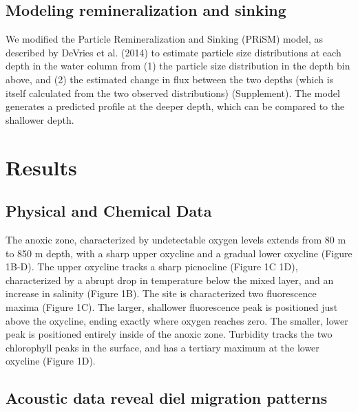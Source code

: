 \documentclass[]{article}
\begin{document}
\hypertarget{modeling-remineralization-and-sinking}{%
\subsection{Modeling remineralization and
sinking}\label{modeling-remineralization-and-sinking}}

We modified the Particle Remineralization and Sinking (PRiSM) model, as
described by DeVries et al. (2014) to estimate particle size
distributions at each depth in the water column from (1) the particle
size distribution in the depth bin above, and (2) the estimated change
in flux between the two depths (which is itself calculated from the two
observed distributions) (Supplement). The model generates a predicted
profile at the deeper depth, which can be compared to the shallower
depth.

\hypertarget{results}{%
\section{Results}\label{results}}

\hypertarget{physical-and-chemical-data}{%
\subsection{Physical and Chemical
Data}\label{physical-and-chemical-data}}

The anoxic zone, characterized by undetectable oxygen levels extends
from 80 m to 850 m depth, with a sharp upper oxycline and a gradual
lower oxycline (Figure 1B-D). The upper oxycline tracks a sharp
picnocline (Figure 1C 1D), characterized by a abrupt drop in temperature
below the mixed layer, and an increase in salinity (Figure 1B). The site
is characterized two fluorescence maxima (Figure 1C). The larger,
shallower fluorescence peak is positioned just above the oxycline,
ending exactly where oxygen reaches zero. The smaller, lower peak is
positioned entirely inside of the anoxic zone. Turbidity tracks the two
chlorophyll peaks in the surface, and has a tertiary maximum at the
lower oxycline (Figure 1D).

\hypertarget{acoustic-data-reveal-diel-migration-patterns}{%
\subsection{Acoustic data reveal diel migration
patterns}\label{acoustic-data-reveal-diel-migration-patterns}}
\end{document}
